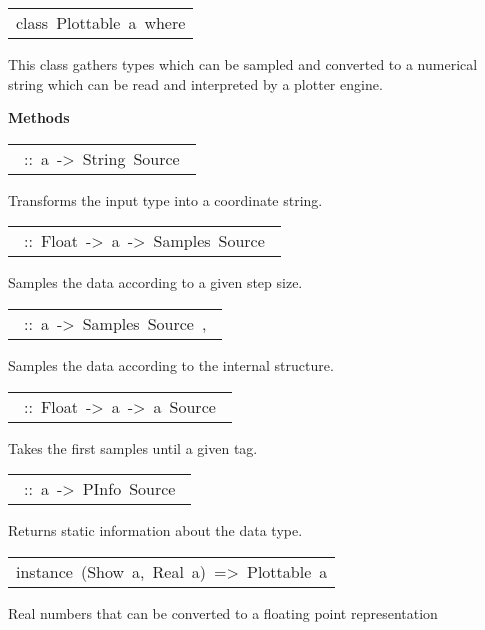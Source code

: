 \begin{haddockdesc}
\item[\begin{tabular}{@{}l}
class\ Plottable\ a\ where
\end{tabular}]\haddockbegindoc
This class gathers types which can be sampled and converted to a
 numerical string which can be read and interpreted by a plotter
 engine.\par

\haddockpremethods{}\textbf{Methods}
\begin{haddockdesc}
\item[\begin{tabular}{@{}l}\haddockid{toCoord}\ ::\ a\ ->\ String\ Source\ \end{tabular}]
\haddockbegindoc
Transforms the input type into a coordinate string.\par

\item[\begin{tabular}{@{}l}\haddockid{sample}\ ::\ Float\ ->\ a\ ->\ Samples\ Source\ \end{tabular}]
\haddockbegindoc
Samples the data according to a given step size.\par

\item[\begin{tabular}{@{}l}\haddockid{sample}\ ::\ a\ ->\ Samples\ Source\ ,\ \end{tabular}]
\haddockbegindoc
Samples the data according to the internal structure.\par

\item[\begin{tabular}{@{}l}\haddockid{takeUntil}\ ::\ Float\ ->\ a\ ->\ a\ Source\ \end{tabular}]
\haddockbegindoc
Takes the first samples until a given tag.\par

\item[\begin{tabular}{@{}l}\haddockid{getInfo}\ ::\ a\ ->\ PInfo\ Source\ \end{tabular}]
\haddockbegindoc
Returns static information about the data type.\par

\end{haddockdesc}


\item[\begin{tabular}{@{}l}
instance\ (Show\ a,\ Real\ a)\ =>\ Plottable\ a
\end{tabular}]\haddockbegindoc
Real numbers that can be converted to a floating point representation\par



\end{haddockdesc}
